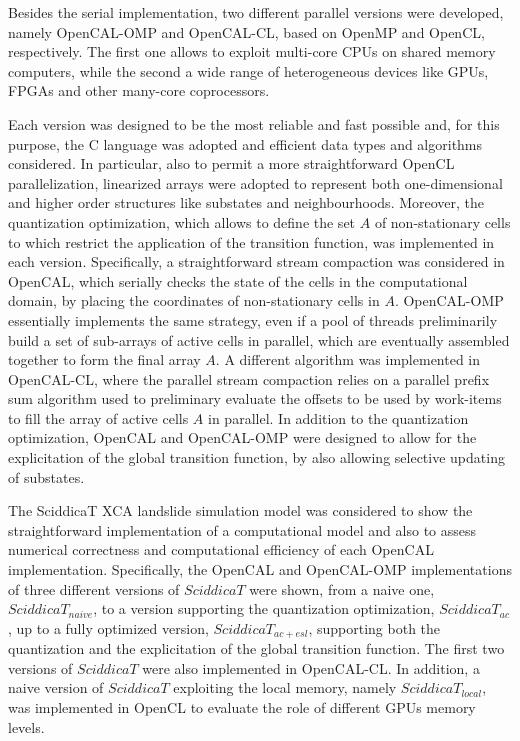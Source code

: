 Besides the serial implementation, two different parallel versions
were developed, namely OpenCAL-OMP and OpenCAL-CL, based on OpenMP
and OpenCL, respectively. The first one allows to exploit multi-core
CPUs on shared memory computers, while the second a wide range of
heterogeneous devices like GPUs, FPGAs and other many-core
coprocessors.

Each version was designed to be the most reliable and fast possible
and, for this purpose, the C language was adopted and efficient data
types and algorithms considered. In particular, also to permit a
more straightforward OpenCL parallelization, linearized arrays were
adopted to represent both one-dimensional and higher order
structures like substates and neighbourhoods. Moreover, the
quantization optimization, which allows to define the set $A$ of
non-stationary cells to which restrict the application of the
transition function, was implemented in each version. Specifically,
a straightforward stream compaction was considered in OpenCAL, which
serially checks the state of the cells in the computational domain,
by placing the coordinates of non-stationary cells in
$A$. OpenCAL-OMP essentially implements the same strategy, even if a
pool of threads preliminarily build a set of sub-arrays of active
cells in parallel, which are eventually assembled together to form
the final array $A$. A different algorithm was implemented in
OpenCAL-CL, where the parallel stream compaction relies on a
parallel prefix sum algorithm used to preliminary evaluate the
offsets to be used by work-items to fill the array of active cells
$A$ in parallel. In addition to the quantization optimization,
OpenCAL and OpenCAL-OMP were designed to allow for the explicitation
of the global transition function, by also allowing selective
updating of substates.

The SciddicaT XCA landslide simulation model was considered to show
the straightforward implementation of a computational model and also
to assess numerical correctness and computational efficiency of each
OpenCAL implementation. Specifically, the OpenCAL and OpenCAL-OMP
implementations of three different versions of $SciddicaT$ were
shown, from a naive one, $SciddicaT_{naive}$, to a version
supporting the quantization optimization, $SciddicaT_{ac}$, up to a
fully optimized version, $SciddicaT_{ac+esl}$, supporting both the
quantization and the explicitation of the global transition
function. The first two versions of $SciddicaT$ were also
implemented in OpenCAL-CL. In addition, a naive version of
$SciddicaT$ exploiting the local memory, namely $SciddicaT_{local}$,
was implemented in OpenCL to evaluate the role of different GPUs
memory levels.

